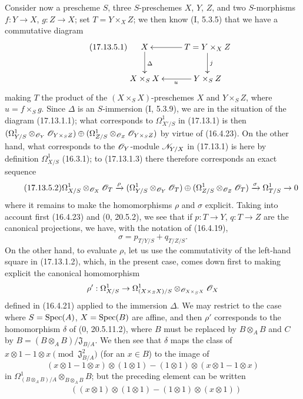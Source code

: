\begin{env}[17.13.5]
\label{IV.17.13.5}
Consider now a prescheme $S$, three $S$-preschemes $X$, $Y$, $Z$, and two $S$-morphisms $f:Y\to X$, $g:Z\to X$; set $T=Y\times_XZ$; we then know (I, 5.3.5) that we have a commutative diagram
\[
\label{IV.17.13.5.1}
\tag{17.13.5.1}
\xymatrix{
  X \ar[d]^{\Delta} & T=Y\times_X Z \ar[l] \ar[d]^{j}\\
  X\times_S X & Y\times_S Z \ar[l]^{u}
}
\]
making $T$ the product of the $(X\times_SX)$-preschemes $X$ and $Y\times_SZ$, where $u=f\times_Sg$. Since $\Delta$ is an $S$-immersion (I, 5.3.9), we are in the situation of the diagram (17.13.1.1); what corresponds to $\Omega^1_{X'/S}$ in (17.13.1) is then $(\Omega^1_{Y/S}\otimes_{\mathscr{O}_Y}\mathscr{O}_{Y\times_SZ})\oplus(\Omega^1_{Z/S}\otimes_{\mathscr{O}_Z}\mathscr{O}_{Y\times_SZ})$ by virtue of (16.4.23). On the other hand, what corresponds to the $\mathscr{O}_Y$-module $\mathscr{N}_{Y/X}$ in (17.13.1) is here by definition $\Omega^1_{X/S}$ (16.3.1); to (17.13.1.3) there therefore corresponds an exact sequence
\[
\label{IV.17.13.5.2}
\tag{17.13.5.2}
\Omega^1_{X/S}\otimes_{\mathscr{O}_X}\mathscr{O}_T\xrightarrow{\rho}
(\Omega^1_{Y/S}\otimes_{\mathscr{O}_Y}\mathscr{O}_T)\oplus
(\Omega^1_{Z/S}\otimes_{\mathscr{O}_Z}\mathscr{O}_T)
\xrightarrow{\sigma}\Omega^1_{T/S}\to0
\]
where it remains to make the homomorphisms $\rho$ and $\sigma$ explicit. Taking into account first (16.4.23) and (0, 20.5.2), we see that if $p:T\to Y$, $q:T\to Z$ are the canonical projections, we have, with the notation of (16.4.19),
\[
\label{IV.17.13.5.3}
\tag{17.13.5.3}
\sigma=p_{T/Y/S}+q_{T/Z/S}.
\]
On the other hand, to evaluate $\rho$, let us use the commutativity of the left-hand square in (17.13.1.2), which, in the present case, comes down first to making explicit the canonical homomorphism
\[
\rho':\Omega^1_{X/S}\to\Omega^1_{(X\times_SX)/S}\otimes_{\mathscr{O}_{X\times_SX}}\mathscr{O}_X
\]
defined in (16.4.21) applied to the immersion $\Delta$. We may restrict to the case where $S=\operatorname{Spec}(A)$, $X=\operatorname{Spec}(B)$ are affine, and then $\rho'$ corresponds to the homomorphism $\delta$ of (0, 20.5.11.2), where $B$ must be replaced by $B\otimes_AB$ and $C$ by $B=(B\otimes_AB)/\mathfrak J_{B/A}$. We then see that $\delta$ maps the class of $x\otimes1-1\otimes x\pmod{\mathfrak J_{B/A}^2}$ (for an $x\in B$) to the image of
\[
(x\otimes1-1\otimes x)\otimes(1\otimes1)-(1\otimes1)\otimes(x\otimes1-1\otimes x)
\]
in $\Omega^1_{(B\otimes_AB)/A}\otimes_{B\otimes_AB}B$; but the preceding element can be written
\[
\begin{split}
&((x\otimes1)\otimes(1\otimes1)-(1\otimes1)\otimes(x\otimes1))\\

\end{split}\]
\end{env}
